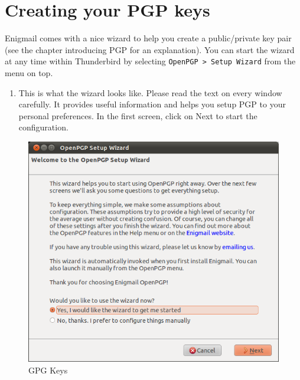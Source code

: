 \section{Creating your PGP keys}

Enigmail comes with a nice wizard to help you create a public/private
key pair (see the chapter introducing PGP for an explanation). You can
start the wizard at any time within Thunderbird by selecting
\verb!OpenPGP > Setup Wizard! from the menu on top.

\begin{enumerate}[1.]
\item
  This is what the wizard looks like. Please read the text on every
  window carefully. It provides useful information and helps you setup
  PGP to your personal preferences. In the first screen, click on Next
  to start the configuration.
\end{enumerate}
\begin{figure}[htbp]
\centering
\includegraphics{gpg_keys_1.png}
\caption{GPG Keys}
\end{figure}

